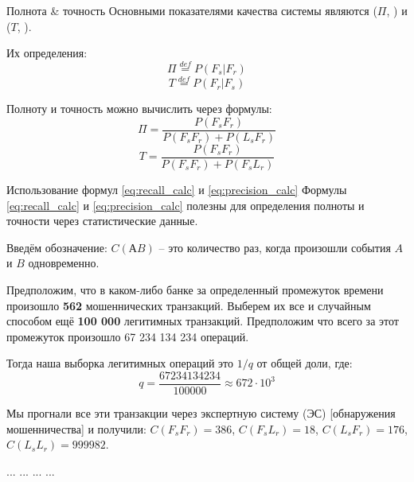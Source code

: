  \begin{frame}{Полнота \& точность}\label{frame:presicion_recall}
	Основными показателями качества системы являются 
	 ($\Pi$, ) 
	и 
	 ($T$, ).
	
	Их определения:
	\begin{equation}
	\Pi \stackrel{def}{=} P(F_s | F_r)
	\end{equation}
	\begin{equation}
	T \stackrel{def}{=} P(F_r | F_s)
	\end{equation}
	
	Полноту и точность можно вычислить через формулы:
	\begin{equation}\label{eq:recall_calc}
	\Pi = \frac{P(F_s  F_r)}{P(F_s F_r) + P(L_s F_r)}
	\end{equation}
	\begin{equation}\label{eq:precision_calc}
	T = \frac{P(F_s F_r)}{P(F_s F_r) + P(F_s L_r)}
	\end{equation}
	
\end{frame}

\begin{frame}{Использование формул \eqref{eq:recall_calc} и \eqref{eq:precision_calc}}\label{frame:precision_calc_example}
	\footnotesize
	Формулы \eqref{eq:recall_calc} и \eqref{eq:precision_calc} полезны 
	для определения полноты и точности через статистические данные.
	
	Введём обозначение: $C(АB)$ -- это количество раз, когда произошли события $A$ и $B$ одновременно.
	
	Предположим, что в каком-либо банке за определенный промежуток времени
	произошло \textbf{562} мошеннических транзакций. 
	Выберем их все и случайным способом ещё \textbf{100 000} легитимных транзакций.
	Предположим что всего за этот промежуток произошло 67 234 134 234 операций. 
	
	Тогда наша выборка легитимных операций это $1/q$ от общей доли, где: 
	\begin{equation*}
	q = \frac{67234134234}{100000} \approx 672 \cdot 10^3
	\end{equation*}
	
	Мы прогнали все эти транзакции через экспертную систему (ЭС) [обнаружения мошенничества] и получили:
	$C(F_s F_r)= 386$, 
	$C(F_s L_r)= 18$, 
	$C(L_s F_r)= 176$, 
	$C(L_s L_r)= 999 982$.
	
	... ... ... ...
\end{frame}

